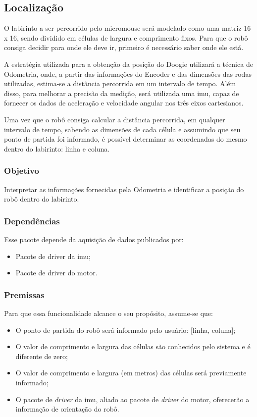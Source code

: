 \subsection{Localização}
\label{ssec:funcionalidade_localizacao}
O labirinto a ser percorrido pelo micromouse será modelado como uma matriz 16 x 16, sendo dividido em células de largura e comprimento fixos. Para que o robô consiga decidir para onde ele deve ir, primeiro é necessário saber onde ele está.

A estratégia utilizada para a obtenção da posição do Doogie utilizará a técnica de Odometria, onde, a partir das informações do Encoder e das dimensões das rodas utilizadas, estima-se a distância percorrida em um intervalo de tempo. Além disso, para melhorar a precisão da medição, será utilizada uma \gls*{imu}, capaz de fornecer os dados de aceleração e velocidade angular nos três eixos cartesianos.

Uma vez que o robô consiga calcular a distância percorrida, em qualquer intervalo de tempo, sabendo as dimensões de cada célula e assumindo que seu ponto de partida foi informado, é possível determinar as coordenadas do mesmo dentro do labirinto: linha e coluna. 

\subsubsection{Objetivo}
Interpretar as informações fornecidas pela Odometria e identificar a posição do robô dentro do labirinto.

\subsubsection{Dependências}
Esse pacote depende da aquisição de dados publicados por:
\begin{itemize}
	\item Pacote de driver da \gls*{imu};
	\item Pacote de driver do motor.
\end{itemize}
	
\subsubsection{Premissas}
Para que essa funcionalidade alcance o seu propósito, assume-se que:
\begin{itemize}
	\item O ponto de partida do robô será informado pelo usuário: [linha, coluna];
	\item O valor de comprimento e largura das células são conhecidos pelo sistema e é diferente de zero;
	\item O valor de comprimento e largura (em metros) das células será previamente informado;
	\item O pacote de \textit{driver} da \gls*{imu}, aliado ao pacote de \textit{driver} do motor, oferecerão a informação de orientação do robô.
\end{itemize}

